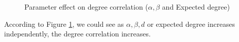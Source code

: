 \documentclass{article}
\begin{document}
\begin{itemize}
\begin{itemize}
\begin{figure}
\hfill
{}
\hfill
{}
\hfill
{}
\hfill
\caption{
\label{fig1}%
Parameter effect on degree correlation ($\alpha, \beta$ and Expected degree)}
\end{figure}

According to Figure \ref{fig1}, we could see as $\alpha, \beta, d$ or expected degree increases independently, the degree correlation increases.


\end{itemize}

 
\end{itemize}
\end{document}
